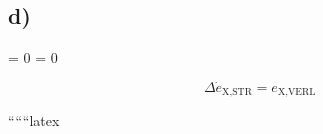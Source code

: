 

\subsection*{d)}

 \quad {} = 0 \quad {} = 0

\[
\Delta \dot{e}_{\text{X,STR}} = e_{\text{X,VERL}}
\]

``````latex
